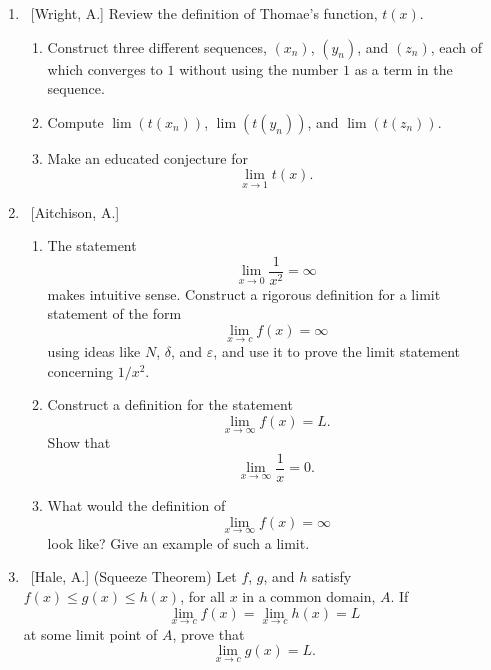 \documentclass[10pt]{article}
\theoremstyle{definition}
\begin{document}
\begin{enumerate}
\begin{enumerate}
	\end{enumerate}
	
	
\item  ~[Wright, A.] Review the definition of Thomae's function, $t(x)$.

	\begin{enumerate}
	
	\item  Construct three different sequences, $(x_n)$, $(y_n)$, and $(z_n)$, each of which converges to $1$ without using the number $1$ as a term in the sequence.
	
	\item  Compute $\lim{(t(x_n))}$, $\lim{(t(y_n))}$, and $\lim{(t(z_n))}$.
	
	\item  Make an educated conjecture for $$\lim_{x \to 1} t(x).$$ %
	
	\end{enumerate}
	

\item  ~[Aitchison, A.]

	\begin{enumerate}
	
	\item  The statement $$\lim_{x \to 0} \frac{1}{x^2} = \infty$$ makes intuitive sense.  Construct a rigorous definition for a limit statement of the form $$\lim_{x \to c} f(x) = \infty$$ using ideas like $N$, $\delta$, and $\varepsilon$, and use it to prove the limit statement concerning $1/x^2$.
	
	\item  Construct a definition for the statement $$\lim_{x \to \infty} f(x) = L.$$ Show that $$\lim_{x \to \infty} \frac{1}{x} = 0.$$
	
	\item  What would the definition of $$\lim_{x \to \infty} f(x) = \infty$$ look like?  Give an example of such a limit.
	
	\end{enumerate}
	

\item  ~[Hale, A.] (Squeeze Theorem)  Let $f$, $g$, and $h$ satisfy $f(x) \leq g(x) \leq h(x)$, for all $x$ in a common domain, $A$.  If $$\lim_{x \to c} f(x) = \lim_{x \to c} h(x) = L$$ at some limit point of $A$, prove that $$\lim_{x \to c} g(x) = L.$$


\end{enumerate}
\end{document}
